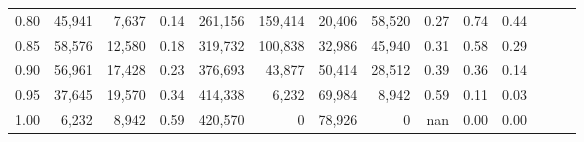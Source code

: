 \begin{tabular}{rrrrrrrrrrrrrr}
0.80 &  45,941 &   7,637 &  0.14 &  261,156 &  159,414 &  20,406 &  58,520 &  0.27 &  0.74 &      0.44 \\
0.85 &  58,576 &  12,580 &  0.18 &  319,732 &  100,838 &  32,986 &  45,940 &  0.31 &  0.58 &      0.29 \\
0.90 &  56,961 &  17,428 &  0.23 &  376,693 &   43,877 &  50,414 &  28,512 &  0.39 &  0.36 &      0.14 \\
0.95 &  37,645 &  19,570 &  0.34 &  414,338 &    6,232 &  69,984 &   8,942 &  0.59 &  0.11 &      0.03 \\
1.00 &   6,232 &   8,942 &  0.59 &  420,570 &        0 &  78,926 &       0 &   nan &  0.00 &      0.00 \\
\bottomrule
\end{tabular}
